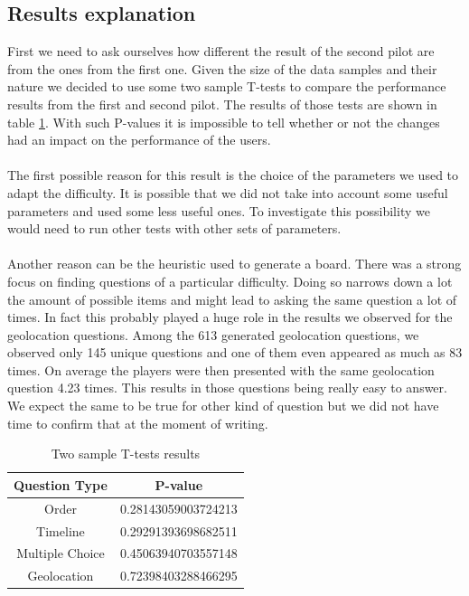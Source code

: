 \subsection{Results explanation}\label{subsec:explained}
First we need to ask ourselves how different the result of the second pilot are from the ones from the first one. Given the size of the data samples and their nature we decided to use some two sample T-tests to compare the performance results from the first and second pilot. The results of those tests are shown in table \ref{table:pvals}. With such P-values it is impossible to tell whether or not the changes had an impact on the performance of the users.\\\\
The first possible reason for this result is the choice of the parameters we used to adapt the difficulty. It is possible that we did not take into account some useful parameters and used some less useful ones. To investigate this possibility we would need to run other tests with other sets of parameters.\\\\
Another reason can be the heuristic used to generate a board. There was a strong focus on finding questions of a particular difficulty. Doing so narrows down a lot the amount of possible items and might lead to asking the same question a lot of times. In fact this probably played a huge role in the results we observed for the geolocation questions. Among the 613 generated geolocation questions, we observed only 145 unique questions and one of them even appeared as much as 83 times. On average the players were then presented with the same geolocation question 4.23 times. This results in those questions being really easy to answer. We expect the same to be true for other kind of question but we did not have time to confirm that at the moment of writing.

\begin{table}[ht]
\caption{Two sample T-tests results}
\centering
\begin{tabular}{c c}
\hline\hline
Question Type & P-value \\ [0.5ex]

\hline
Order & 0.28143059003724213 \\
Timeline & 0.29291393698682511 \\
Multiple Choice & 0.45063940703557148 \\
Geolocation & 0.72398403288466295 \\ [1ex]
\hline
\end{tabular}
\label{table:pvals}
\end{table}

